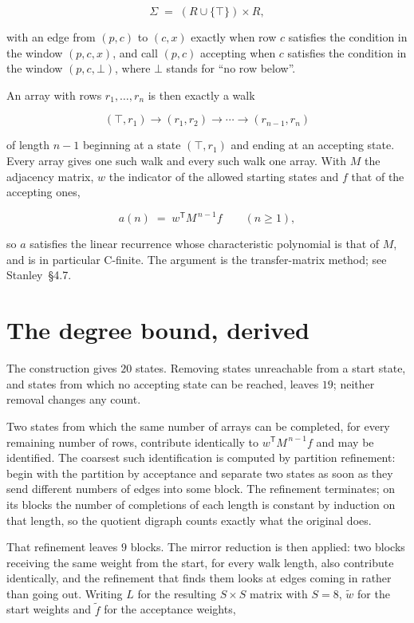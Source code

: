 \documentclass[11pt]{article}
\theoremstyle{definition}
\begin{document}
\[\Sigma \;=\; (R \cup \{\top\}) \times R,\]

with an edge from $(p,c)$ to $(c,x)$ exactly when row $c$ satisfies the condition in the window $(p,c,x)$, and call $(p,c)$ accepting when $c$ satisfies the condition in the window $(p,c,\bot)$, where $\bot$ stands for ``no row below''.

An array with rows $r_1,\dots,r_n$ is then exactly a walk

\[(\top,r_1) \to (r_1,r_2) \to \cdots \to (r_{n-1},r_n)\]

of length $n-1$ beginning at a state $(\top,r_1)$ and ending at an accepting state. Every array gives one such walk and every such walk one array. With $M$ the adjacency matrix, $w$ the indicator of the allowed starting states and $f$ that of the accepting ones,

\[a(n) \;=\; w^{\mathsf T} M^{\,n-1} f \qquad (n \ge 1),\]

so $a$ satisfies the linear recurrence whose characteristic polynomial is that of $M$, and is in particular C-finite. The argument is the transfer-matrix method; see Stanley~\S4.7.

\section{The degree bound, derived}

The construction gives $20$ states. Removing states unreachable from a start state, and states from which no accepting state can be reached, leaves $19$; neither removal changes any count.

Two states from which the same number of arrays can be completed, for every remaining number of rows, contribute identically to $w^{\mathsf T}M^{\,n-1}f$ and may be identified. The coarsest such identification is computed by partition refinement: begin with the partition by acceptance and separate two states as soon as they send different numbers of edges into some block. The refinement terminates; on its blocks the number of completions of each length is constant by induction on that length, so the quotient digraph counts exactly what the original does.

That refinement leaves $9$ blocks. The mirror reduction is then applied: two blocks receiving the same weight from the start, for every walk length, also contribute identically, and the refinement that finds them looks at edges coming in rather than going out. Writing $L$ for the resulting $S \times S$ matrix with $S = 8$, $\tilde w$ for the start weights and $\tilde f$ for the acceptance weights,
\end{document}
